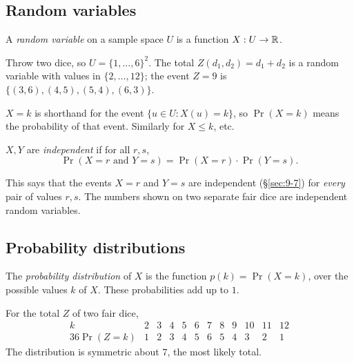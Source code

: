 \subsection{Random variables}
\label{sec:10-1}

\begin{definition}
A \emph{random variable} on a sample space $U$ is a function $X:U\to\mathbb{R}$.
\end{definition}

\begin{example}
Throw two dice, so $U=\{1,\dots,6\}^2$. The total $Z(d_1,d_2)=d_1+d_2$ is a random variable with values in $\{2,\dots,12\}$; the event $Z=9$ is $\{(3,6),(4,5),(5,4),(6,3)\}$.
\end{example}

\begin{note}[Notation]
$X=k$ is shorthand for the event $\{u\in U : X(u)=k\}$, so $\Pr(X=k)$ means the probability of that event. Similarly for $X\le k$, etc.
\end{note}

\begin{definition}
$X,Y$ are \emph{independent} if for all $r,s$,
\[
\Pr(X=r \text{ and } Y=s) = \Pr(X=r)\cdot\Pr(Y=s).
\]
\end{definition}

\begin{note}
This says that the events $X=r$ and $Y=s$ are independent (\S\ref{sec:9-7}) for \emph{every} pair of values $r,s$. The numbers shown on two separate fair dice are independent random variables.
\end{note}

\subsection{Probability distributions}
\label{sec:10-2}

\begin{definition}
The \emph{probability distribution} of $X$ is the function $p(k) = \Pr(X=k)$, over the possible values $k$ of $X$. These probabilities add up to $1$.
\end{definition}

\begin{example}
For the total $Z$ of two fair dice,
\[
\begin{array}{c|ccccccccccc}
k & 2&3&4&5&6&7&8&9&10&11&12\\\hline
36\Pr(Z=k) & 1&2&3&4&5&6&5&4&3&2&1
\end{array}
\]
The distribution is symmetric about $7$, the most likely total.
\end{example}

